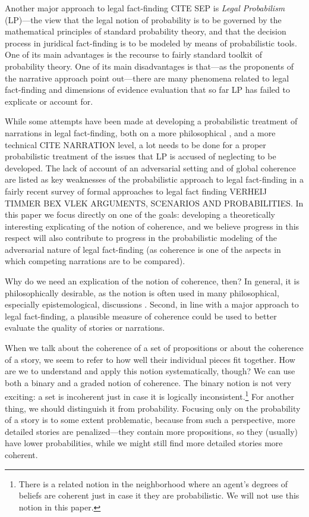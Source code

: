 \documentclass[10pt,]{scrartcl}
\begin{document}
Another major  approach to legal fact-finding CITE SEP is
\emph{Legal Probabilism} (LP)---the view that the legal notion of probability is to be governed by the  ma\-the\-ma\-ti\-cal principles of standard probability theory, and that the decision process in juridical fact-finding is to be modeled by means of probabilistic tools. One of its main advantages is the recourse to fairly standard toolkit of probability theory. One of its main disadvantages is that---as the proponents of the narrative approach point out---there are many phenomena related to legal fact-finding and dimensions of evidence evaluation  that so far LP has failed to explicate or account for.

While some attempts have been made at developing a probabilistic treatment of narrations in legal fact-finding, both on a more philosophical  \citep{di2013statistics}, and a more technical  CITE NARRATION level, a lot needs to be done for a proper probabilistic treatment of the issues that LP is accused of neglecting to be developed. The lack of account of an adversarial setting and of global coherence are listed as key weaknesses of the probabilistic approach to legal fact-finding in a fairly recent survey of formal approaches to legal fact finding VERHEIJ TIMMER BEX VLEK  ARGUMENTS, SCENARIOS AND PROBABILITIES. In this paper we focus directly on one of the goals: developing a theoretically interesting explicating of the notion of coherence, and we believe progress in this respect will also contribute to progress in the probabilistic modeling of the adversarial nature of legal fact-finding (as coherence is one of the aspects in which competing narrations are to be compared).  



Why do we need an explication of the notion of coherence, then? 
In general, it is philosophically desirable, as  the notion is often used in many philosophical, especially
epistemological, discussions \citep[for instance, in discussions about the truth-conduciveness of coherence,][]{shogenji1999conducive,olsson2001conducive}.  Second, in line with a major approach to legal fact-finding, a  plausible measure of coherence could be used to better evaluate the quality of  stories or narrations. 






When we talk about the coherence of a set of propositions or about the 
coherence of a story, we seem to refer to how well their individual
pieces fit together. How are we to understand and apply this notion
systematically, though?   We can use both a binary and a graded notion of coherence. The binary notion is not very exciting: a set is incoherent
just in case it is logically
inconsistent.\footnote{There is a related notion in the neighborhood where an agent's  degrees of beliefs are coherent just in case it they are probabilistic. We will not use this notion in this paper.} For another thing, we should distinguish it from probability.  Focusing only on the probability of a story is to some extent problematic, because from such a perspective, more detailed stories are penalized---they contain more propositions, so they (usually) have lower probabilities, while we might still find more detailed stories more coherent.
\end{document}
